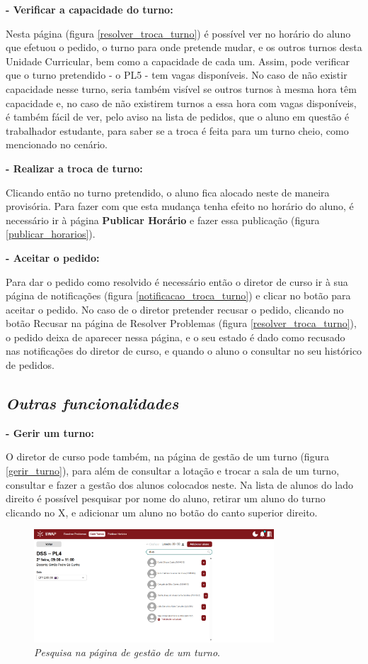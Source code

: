 \documentclass[12pt, a4paper]{article}
\begin{document}
\textbf{- Verificar a capacidade do turno:}

Nesta página (figura \ref{resolver_troca_turno}) é possível ver no horário do aluno que
efetuou o pedido, o turno para onde pretende mudar, e os outros turnos desta
Unidade Curricular, bem como a capacidade de cada um. Assim, pode verificar que o turno
pretendido - o PL5 -  tem vagas disponíveis. No caso de não existir capacidade nesse turno,
seria também visível se outros turnos à mesma hora têm capacidade e, no caso de não
existirem turnos a essa hora com vagas disponíveis, é também fácil de ver, pelo aviso
na lista de pedidos, que o aluno em questão é trabalhador estudante, para saber se a
troca é feita para um turno cheio, como mencionado no cenário.

\textbf{- Realizar a troca de turno:}

Clicando então no turno pretendido, o aluno fica alocado neste de maneira provisória.
Para fazer com que esta mudança tenha efeito no horário do aluno, é necessário ir à
página \textbf{Publicar Horário} e fazer essa publicação (figura \ref{publicar_horarios}).

\textbf{- Aceitar o pedido:}

Para dar o pedido como resolvido é necessário então o diretor de curso ir à sua página
de notificações (figura \ref{notificacao_troca_turno}) e clicar no botão para aceitar o pedido.
No caso de o diretor pretender recusar o pedido, clicando no botão Recusar na página de Resolver
Problemas (figura \ref{resolver_troca_turno}), o pedido deixa de aparecer nessa página, e o seu
estado é dado como recusado nas notificações do diretor de curso, e quando o aluno o consultar no
seu histórico de pedidos.

\subsection{\emph{Outras funcionalidades}}

\textbf{- Gerir um turno:}

O diretor de curso pode também, na página de gestão de um turno (figura \ref{gerir_turno}),
para além de consultar a lotação e trocar a sala de um turno, consultar e fazer a gestão dos
alunos colocados neste. Na lista de alunos do lado direito é possível pesquisar por nome do aluno,
retirar um aluno do turno clicando no X, e adicionar um aluno no botão do canto superior direito.

\begin{figure}[H]
    \centering
    \includegraphics[width=0.8\textwidth]{res/manual/gerir_turno_pesquisar_alunos.png}
    \caption{\emph{Pesquisa na página de gestão de um turno}.}
    \label{gerir_turno_pesquisar}
\end{figure}
\end{document}
